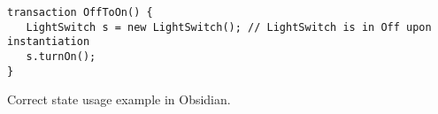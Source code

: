 \begin{listing}
    \centering
    \begin{verbatim}
transaction OffToOn() {
   LightSwitch s = new LightSwitch(); // LightSwitch is in Off upon instantiation
   s.turnOn();
}
    \end{verbatim}
    \caption{Correct state usage example in Obsidian.}
    \label{lst:obsidian-transaction-ok}
\end{listing}